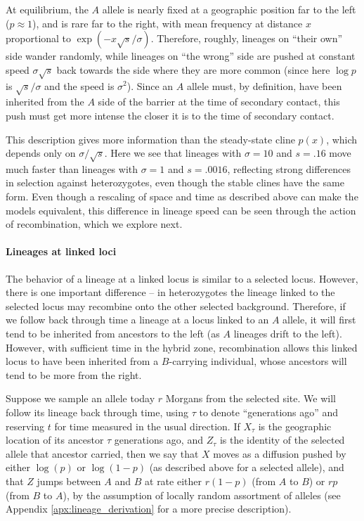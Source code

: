 \documentclass[11pt,letterpaper]{article}
\newcommand{\alisa}[1]{{\em \color{red} #1}}
\begin{document}
At equilibrium, the $A$ allele is nearly fixed at a geographic position far to the left ($p \approx 1$),
and is rare far to the right, with mean frequency at distance $x$ proportional to $\exp(-x\sqrt{s}/\sigma)$.
Therefore, roughly, lineages on ``their own'' side wander randomly,
while lineages on ``the wrong'' side are pushed at constant speed $\sigma\sqrt{s}$ 
back towards the side where they are more common
(since here $\log p$ is $\sqrt{s}/\sigma$ and the speed is $\sigma^2$). 
Since an $A$ allele must, by definition, have been inherited from the $A$ side of the barrier 
at the time of secondary contact, this push must get more intense the closer it is to the time of secondary contact.

This description gives more information than the steady-state cline $p(x)$,
which depends only on $\sigma/\sqrt{s}$.
Here we see that lineages with $\sigma=10$ and $s=.16$ move much faster
than lineages with $\sigma=1$ and $s=.0016$,
reflecting strong differences in selection against heterozygotes,
even though the stable clines have the same form.
Even though a rescaling of space and time as described above can make the models equivalent,
this difference in lineage speed can be seen through the action of recombination, which we explore next.

\paragraph{Lineages at linked loci}
The behavior of a lineage at a linked locus is similar to a selected locus. 
However, there is one important difference -- 
in heterozygotes the lineage linked to the selected locus may
recombine onto the other selected background.
Therefore, if we follow back through time a lineage at a locus linked to an $A$ allele, 
it will first tend to be inherited from ancestors to the left (as $A$ lineages drift to the left). 
However, with sufficient time in the hybrid zone, recombination allows this linked locus 
to have been inherited from a $B$-carrying individual,
whose ancestors will tend to be more from the right.

Suppose we sample an allele today $r$ Morgans from the selected site. 
We will follow its lineage back through time, using $\tau$ to denote ``generations ago''
and reserving $t$ for time measured in the usual direction.
If $X_\tau$ is the geographic location of its ancestor $\tau$ generations ago,
and $Z_\tau$ is the identity of the selected allele that ancestor carried,
then we say that $X$ moves as a diffusion pushed by either $\log(p)$ or $\log(1-p)$ 
(as described above for a selected allele),
and that $Z$ jumps between $A$ and $B$ at rate either $r (1-p)$  (from $A$ to $B$) or $r p$ (from $B$ to $A$),
by the assumption of locally random assortment of alleles
(see Appendix \ref{apx:lineage_derivation} for a more precise description).
\end{document}
